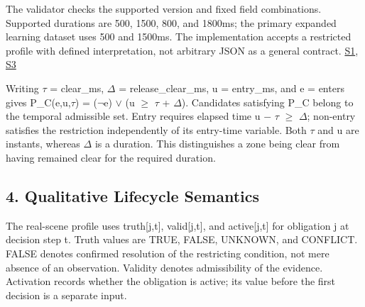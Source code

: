 \documentclass[11pt,a4paper]{article}
\begin{document}
The validator checks the supported version and fixed field combinations. Supported durations are 500, 1500, 800, and 1800ms; the primary expanded learning dataset uses 500 and 1500ms. The implementation accepts a restricted profile with defined interpretation, not arbitrary JSON as a general contract. \href{\detokenize{../../../../../../projects/04-guardsynth-coc/experiments/paper1_cnl_learning/temporal_preservation.py}}{S1}, \href{\detokenize{../../../../../../projects/04-guardsynth-coc/experiments/paper1_cnl_learning/temporal_training_data.py}}{S3}\par

Writing {\ttfamily\small \ensuremath{\tau} = clear\_ms}, {\ttfamily\small \ensuremath{\Delta} = release\_clear\_ms}, {\ttfamily\small u = entry\_ms}, and {\ttfamily\small e = enters} gives {\ttfamily\small P\_C(e,u,\ensuremath{\tau}) = (\ensuremath{\neg}e) \ensuremath{\lor} (u \ensuremath{\geq} \ensuremath{\tau} + \ensuremath{\Delta})}. Candidates satisfying P\_C belong to the temporal admissible set. Entry requires elapsed time {\ttfamily\small u \ensuremath{-} \ensuremath{\tau} \ensuremath{\geq} \ensuremath{\Delta}}; non-entry satisfies the restriction independently of its entry-time variable. Both \ensuremath{\tau} and u are instants, whereas \ensuremath{\Delta} is a duration. This distinguishes a zone being clear from having remained clear for the required duration.\par

\subsection*{4. Qualitative Lifecycle Semantics}

The real-scene profile uses {\ttfamily\small truth[j,t]}, {\ttfamily\small valid[j,t]}, and {\ttfamily\small active[j,t]} for obligation j at decision step t. Truth values are TRUE, FALSE, UNKNOWN, and CONFLICT. FALSE denotes confirmed resolution of the restricting condition, not mere absence of an observation. Validity denotes admissibility of the evidence. Activation records whether the obligation is active; its value before the first decision is a separate input.\par
\end{document}
